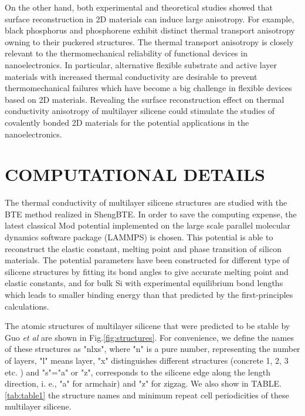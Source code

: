 \documentclass[aps,prb,twocolumn,showpacs,amsmath,amssymb]{revtex4-1}
\begin{document}
On the other hand, both experimental and theoretical studies showed that surface reconstruction in 2D materials can induce large anisotropy. For example, black phosphorus and phosphorene exhibit distinct thermal transport anisotropy owning to their puckered structures\cite{Zhang2015,Peng2015}.
The thermal transport anisotropy is closely relevant to the thermomechanical reliability of functional devices in nanoelectronics. In particular, alternative flexible substrate and active layer materials with increased thermal conductivity are  desirable  to prevent thermomechanical failures which have become a big challenge in flexible devices based on 2D materials\cite{Akinwande2014,Sadeghi2016}. Revealing the surface reconstruction effect on thermal conductivity anisotropy of multilayer silicene could stimulate the studies of covalently bonded 2D materials for the potential applications in the nanoelectronics.



\section{COMPUTATIONAL DETAILS}

The thermal conductivity of multilayer silicene structures are studied with the BTE method realized in ShengBTE\cite{Li2014}. In order to save the computing expense, the latest classical Mod potential\cite{Parks2007} implemented on the large scale parallel  molecular dynamics software package (LAMMPS) is chosen\cite{Kumagai2007Development}. This potential is able to reconstruct the elastic constant, melting point and phase transition of silicon materials. The potential parameters have been constructed for different type of silicene structures by fitting its bond angles to give accurate melting point and elastic constants, and for bulk Si with experimental equilibrium bond lengths which leads to smaller binding energy than that predicted by the first-principles calculations.

The atomic structures of multilayer silicene that were predicted to be stable by Guo \emph{et al}\cite{Guo2015Structural} are shown in Fig.\ref{fig:structures}. For convenience, we define the names of these structures as "nlxs", where "n" is a pure number, representing the number of layers, "l" means layer, "x" distinguishes different structures (concrete 1, 2, 3 etc. ) and "s"="a" or "z", corresponds to the silicene edge along the length direction, i. e.,  "a" for armchair) and "z" for zigzag. We also show in TABLE.\ref{tab:table1} the structure names and  minimum repeat cell periodicities of these multilayer silicene.
\end{document}
